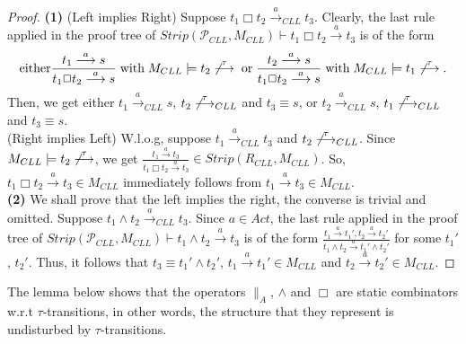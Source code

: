 \documentclass{elsarticle}
\theoremstyle{plain}
\theoremstyle{definition}
\begin{document}
\begin{proof}
  \noindent \textbf{(1)} (Left implies Right) Suppose $t_1 \Box t_2 \stackrel{a}{\longrightarrow}_{{CLL}} t_3$.
  Clearly, the last rule applied in the proof tree of  $Strip({\mathcal P}_{CLL},M_{{CLL}})\vdash t_1 \Box t_2 \stackrel{a}{\longrightarrow} t_3$ is of the form
  \[\text{either}\frac{t_1 \stackrel{a}{\longrightarrow} s}{t_1 \Box t_2 \stackrel{a}{\longrightarrow} s}\;\text{with}\; M_{{CLL}} \models t_2 \not\stackrel{\tau}{\longrightarrow}
  \;\text{or}\; \frac{t_2 \stackrel{a}{\longrightarrow} s}{t_1 \Box t_2 \stackrel{a}{\longrightarrow} s} \; \text{with} \; M_{{CLL}} \models t_1 \not\stackrel{\tau}{\longrightarrow}.\]
  Then, we get either $t_1 \stackrel{a}{\longrightarrow}_{CLL} s$, $t_2 \not\stackrel{\tau}{\longrightarrow}_{CLL}$ and $t_3 \equiv s$, or $t_2 \stackrel{a}{\longrightarrow}_{CLL} s$, $t_1 \not\stackrel{\tau}{\longrightarrow}_{CLL}$ and $t_3 \equiv s$.\\

  \noindent (Right implies Left) W.l.o.g, suppose $t_1 \stackrel{a}{\longrightarrow}_{{CLL}} t_3$ and $t_2 \not\stackrel{\tau}{\longrightarrow}_{CLL}$.
  Since $M_{CLL}\models t_2 \not\stackrel{\tau}{\longrightarrow}$, we get $ \frac{t_1 \stackrel{a}{\longrightarrow} t_3}{t_1 \Box t_2 \stackrel{a}{\longrightarrow} t_3} \in Strip(R_{CLL},M_{CLL})$.
  So, $t_1 \Box t_2 \stackrel{a}{\longrightarrow} t_3 \in M_{CLL}$ immediately follows from $t_1 \stackrel{a}{\longrightarrow} t_3 \in M_{CLL}$.\\

  \noindent \textbf{(2)} We shall prove that the left implies the right, the converse is trivial and omitted.
   Suppose $t_1\wedge t_2 \stackrel{a}{\longrightarrow}_{CLL} t_3$.
   Since $a \in Act$, the last rule applied in the proof tree of $Strip({\mathcal P}_{CLL},M_{CLL}) \vdash t_1\wedge t_2 \stackrel{a}{\longrightarrow} t_3 $ is of the form $\frac{t_1 \stackrel{a}{\longrightarrow} t_1', t_2 \stackrel{a}{\longrightarrow} t_2'}{t_1\wedge t_2 \stackrel{a}{\longrightarrow} t_1'\wedge t_2'}$ for some $t_1'$, $t_2'$.
   Thus, it follows that $t_3 \equiv t_1'\wedge t_2'$, $t_1 \stackrel{a}{\longrightarrow} t_1' \in M_{CLL}$ and $t_2 \stackrel{a}{\longrightarrow} t_2' \in M_{CLL}$.
\end{proof}

The lemma below shows that the operators $\parallel_A$, $\wedge$ and $\Box$ are static combinators w.r.t $\tau$-transitions, in other words, the structure that they represent is undisturbed by $\tau$-transitions.
\end{document}
